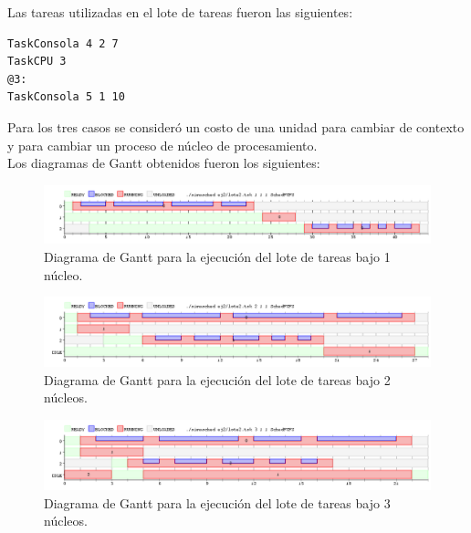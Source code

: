 \documentclass[a4paper]{article}
\begin{document}
Las tareas utilizadas en el lote de tareas fueron las siguientes:
	\begin{codesnippet}
	\begin{verbatim}
TaskConsola 4 2 7
TaskCPU 3
@3:
TaskConsola 5 1 10
	\end{verbatim}
	\end{codesnippet}

Para los tres casos se consider\'o un costo de una unidad para cambiar de contexto y para cambiar un proceso de n\'ucleo de procesamiento.\\

Los diagramas de Gantt obtenidos fueron los siguientes:\\

 \begin{figure}[h!]
   \begin{center}
 	\includegraphics[scale=0.5]{imagenes/ej2/1core.png}
 	\caption{Diagrama de Gantt para la ejecuci\'on del lote de tareas bajo 1 n\'ucleo.}
   \end{center}
 \end{figure} 
 

 \begin{figure}[h!]
   \begin{center}
 	\includegraphics[scale=0.5]{imagenes/ej2/2core.png}
 	\caption{Diagrama de Gantt para la ejecuci\'on del lote de tareas bajo 2 n\'ucleos.}
   \end{center}
 \end{figure} 
 
  \newpage

  \begin{figure}[h!]
   \begin{center}
 	\includegraphics[scale=0.5]{imagenes/ej2/3core.png}
 	\caption{Diagrama de Gantt para la ejecuci\'on del lote de tareas bajo 3 n\'ucleos.}
   \end{center}
 \end{figure} 
\end{document}

